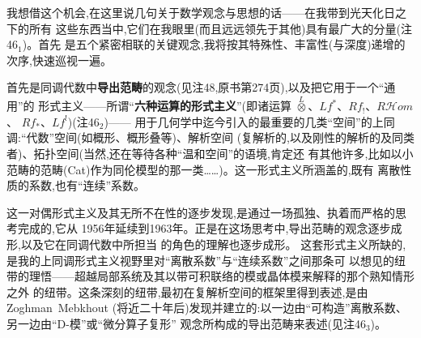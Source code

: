 
\pmark{} 我想借这个机会,在这里说几句关于数学观念与思想的话——在我带到光天化日之下的所有
这些东西当中,它们在我眼里(而且远远领先于其他)具有最广大的分量(注46$_{1}$)。首先
是五个紧密相联的关键观念,我将按其特殊性、丰富性(与深度)递增的次序,快速巡视一遍。

首先是同调代数中\textbf{导出范畴}的观念(见注48,原书第274页),以及把它用于一个“通用”的
形式主义——所谓“\textbf{六种运算的形式主义}”(即诸运算 $\overset{L}{\otimes}$、$Lf^*$、$Rf_!$、$R\mathcal{H}om$、
$Rf_*$、$Lf^!$)(注46$_{2}$)——
用于几何学中迄今引入的最重要的几类“空间”的上同调:“代数”空间(如概形、概形叠等)、解析空间
(复解析的,以及刚性的解析的及同类者)、拓扑空间(当然,还在等待各种“温和空间”的语境,肯定还
有其他许多,比如以小范畴的范畴(Cat)作为同伦模型的那一类……)。这一形式主义所涵盖的,既有
离散性质的系数,也有“连续”系数。

这一对偶形式主义及其无所不在性的逐步发现,是通过一场孤独、执着而严格的思考完成的,它从
1956年延续到1963年。正是在这场思考中,导出范畴的观念逐步成形,以及它在同调代数中所担当
的角色的理解也逐步成形。
这套形式主义所缺的,是我的上同调形式主义视野里对“离散系数”与“连续系数”之间那条可
以想见的纽带的理悟——超越局部系统及其以带可积联络的模或晶体模来解释的那个熟知情形之外
的纽带。这条深刻的纽带,最初在复解析空间的框架里得到表述,是由Zoghman~Mebkhout
(将近二十年后)发现并建立的:以一边由“可构造”离散系数、另一边由“D-模”或“微分算子复形”
观念所构成的导出范畴来表述(见注46$_{3}$)。

